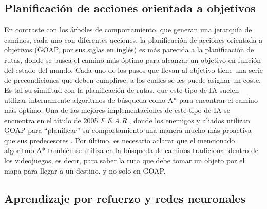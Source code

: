 \subsection{Planificación de acciones orientada a objetivos}
En contraste con los árboles de comportamiento, que generan una jerarquía de caminos, cada uno con diferentes acciones, la planificación de acciones orientada a objetivos (GOAP, por sus siglas en inglés) es más parecida a la planificación de rutas, donde se busca el camino más óptimo para alcanzar un objetivo en función del estado del mundo. Cada uno de los pasos que llevan al objetivo tiene una serie de precondiciones que deben cumplirse, a los cuales se les puede asignar un coste. Es tal su similitud con la planificación de rutas, que este tipo de IA suelen utilizar internamente algoritmos de búsqueda como A* para encontrar el camino más óptimo. Una de las mejores implementaciones de este tipo de IA se encuentra en el título de 2005 \textit{F.E.A.R.}, donde los enemigos y aliados utilizan GOAP para ``planificar'' su comportamiento una manera mucho más proactiva que sus predecesores . Por último, es necesario aclarar que el mencionado algoritmo A* también se utiliza en la búsqueda de caminos tradicional dentro de los videojuegos, es decir, para saber la ruta que debe tomar un objeto por el mapa para llegar a un destino, y no solo en GOAP.


\subsection{Aprendizaje por refuerzo y redes neuronales}




